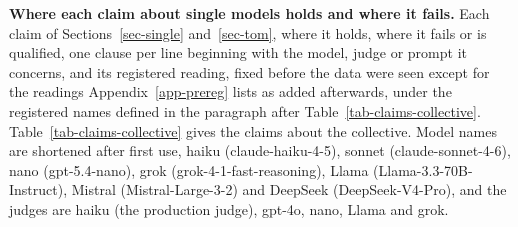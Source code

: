 \providecommand{\claimcl}{\par\hangindent=0.7em\hangafter=1\relax}
\begin{table}[t]
\centering
\footnotesize
\caption{\textbf{Where each claim about single models holds and where it fails.}
Each claim of Sections~\ref{sec-single}
and~\ref{sec-tom}, where it holds, where it fails or is qualified, one clause
per line beginning with the model, judge or prompt it concerns, and its
registered reading, fixed before the data were seen except for the readings
Appendix~\ref{app-prereg} lists as added afterwards, under the registered
names defined in the paragraph after Table~\ref{tab-claims-collective}.
Table~\ref{tab-claims-collective} gives the claims about the collective.
Model names are shortened after first use, haiku (claude-haiku-4-5), sonnet
(claude-sonnet-4-6), nano (gpt-5.4-nano), grok (grok-4-1-fast-reasoning),
Llama (Llama-3.3-70B-Instruct), Mistral (Mistral-Large-3-2) and DeepSeek
(DeepSeek-V4-Pro), and the judges are haiku (the production judge), gpt-4o,
nano, Llama and grok.}

\end{table}
